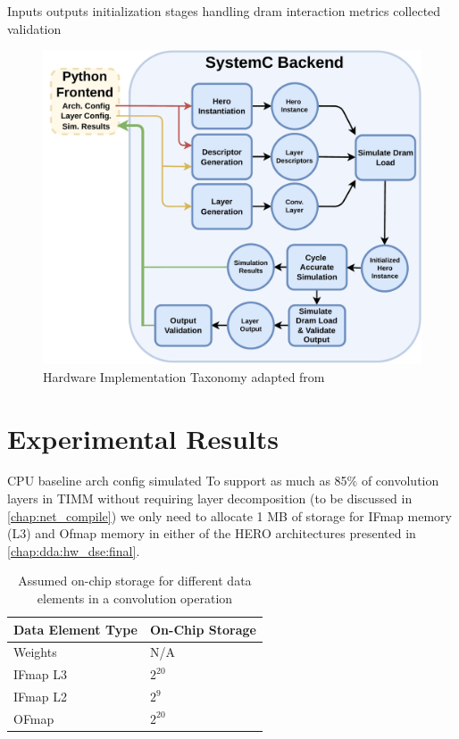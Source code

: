 Inputs outputs
initialization stages
handling dram interaction
metrics collected
validation

\begin{figure}[ht]
    \centering
    \includegraphics[scale=0.58]{fig/hero-sim-backend.pdf}
    \caption{Hardware Implementation Taxonomy adapted from \cite{maestro}}
    \label{fig:hw_taxonomy}
\end{figure}

\section{Experimental Results}
\label{chap:hero:sim_platform:cigar_side}

CPU baseline
arch config simulated
To support as much as 85\% of convolution layers in TIMM
without requiring layer decomposition (to be discussed in
\autoref{chap:net_compile}) we only need to allocate 1 MB of storage for IFmap
memory (L3) and Ofmap memory in either of the HERO architectures presented in
\autoref{chap:dda:hw_dse:final}.
\begin{table}[]
    \center
    \begin{tabular}{|l|l|}
    \hline
    Data Element Type & On-Chip Storage    \\ \hline
    Weights           & N/A   \\ \hline
    IFmap L3          & $2^{20}$   \\ \hline
    IFmap L2          & $2^{9}$   \\ \hline
    OFmap             & $2^{20}$   \\ \hline
    \end{tabular}
    \caption{Assumed on-chip storage for different data elements in a convolution operation}
    \label{tab:assumed_storage}
\end{table}


